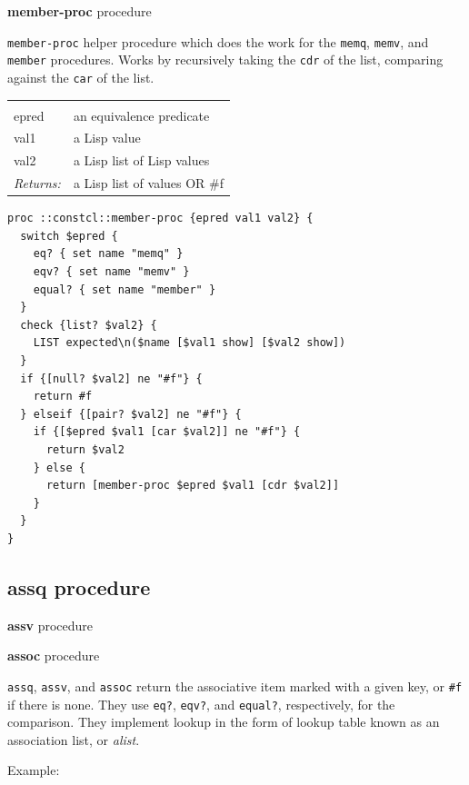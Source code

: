\documentclass[twoside,9pt]{report}
\begin{document}
\textbf{member-proc} procedure


\texttt{member-proc} helper procedure which does the work for the \texttt{memq}, \texttt{memv}, and \texttt{member} procedures. Works by recursively taking the \texttt{cdr} of the list, comparing against the \texttt{car} of the list.

\noindent\begin{tabular}{ |p{1.5cm} p{8cm}| }
\hline
\rowcolor[HTML]{CCCCCC} \multicolumn{2}{|l|}{\bf member-proc (internal)} \\
epred & an equivalence predicate \\
val1 & a Lisp value \\
val2 & a Lisp list of Lisp values \\
\textit{Returns:} & a Lisp list of values OR \#f \\
\hline
\end{tabular}
\begin{lstlisting}
proc ::constcl::member-proc {epred val1 val2} {
  switch $epred {
    eq? { set name "memq" }
    eqv? { set name "memv" }
    equal? { set name "member" }
  }
  check {list? $val2} {
    LIST expected\n($name [$val1 show] [$val2 show])
  }
  if {[null? $val2] ne "#f"} {
    return #f
  } elseif {[pair? $val2] ne "#f"} {
    if {[$epred $val1 [car $val2]] ne "#f"} {
      return $val2
    } else {
      return [member-proc $epred $val1 [cdr $val2]]
    }
  }
}
\end{lstlisting}
\subsection{assq procedure}
\label{assq-procedure}


\textbf{assv} procedure


\textbf{assoc} procedure


\texttt{assq}, \texttt{assv}, and \texttt{assoc} return the associative item marked with a given key, or \texttt{\#f} if there is none. They use \texttt{eq?}, \texttt{eqv?}, and \texttt{equal?}, respectively, for the comparison. They implement lookup in the form of lookup table known as an association list, or \emph{alist}.


Example:
\end{document}
